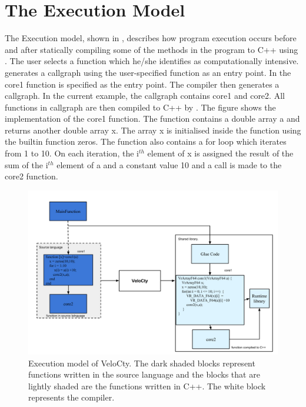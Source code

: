 \section{The Execution Model} 
\label{sec:execModel}
The Execution model, shown in , describes how program execution occurs before and after statically compiling some of the methods in the program to C++ using \velocty. The user selects a function which he/she identifies as computationally intensive. \velocty generates a callgraph using the user-specified function as an entry point. In  the core1 function is specified as the entry point. The compiler then generates a callgraph. In the current example, the callgraph contains core1 and core2. All functions in callgraph are then compiled to C++ by \velocty. The figure shows the implementation of the core1 function. The function contains a double array \textsf{a} and returns another double array \textsf{x}. The array \textsf{x} is initialised inside the function using the builtin function \textsf{zeros}. The function also contains a for loop which iterates from 1 to 10. On each iteration, the i$^{th}$ element of \textsf{x} is assigned the result of the sum of the i$^{th}$ element of \textsf{a} and a constant value 10 and a call is made to the \textsf{core2} function. 
\begin{figure}[htbp]
\begin{center}
\includegraphics[scale=0.4]{Figures/WorkingDetails.png}
\caption[Execution Model]{Execution model of VeloCty. The dark shaded blocks represent functions written in the source language and the blocks that are lightly shaded are the functions written in C++. The white block represents the \velocty compiler.}\label{Fig:working}
\end{center}
\end{figure}

